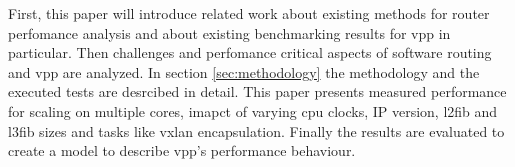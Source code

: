 

First, this paper will introduce related work about existing methods
for router perfomance analysis and about existing benchmarking results
for \Ac{vpp} in particular. Then challenges and perfomance critical
aspects of software routing and \Ac{vpp} are analyzed. In section
\ref{sec:methodology} the methodology and the executed tests are
desrcibed in detail. This paper presents measured performance for
scaling on multiple cores, imapct of varying cpu clocks, IP version,
l2fib and l3fib sizes and tasks like \Ac{vxlan} encapsulation. Finally
the results are evaluated to create a model to describe \Ac{vpp}'s
performance behaviour.
